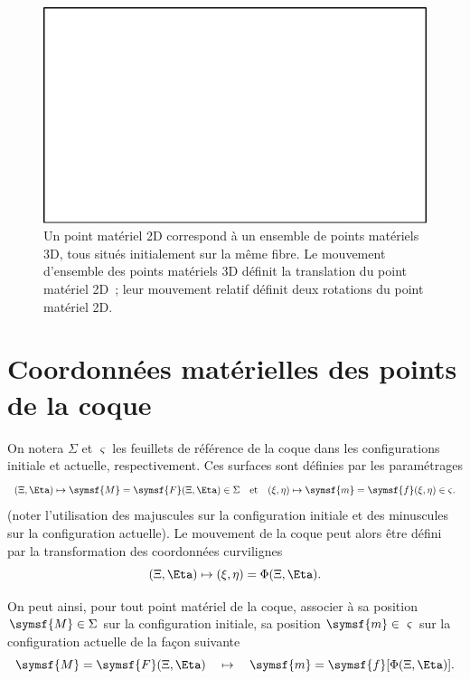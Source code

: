 \documentclass[
  a4paper,
  DIV=11,
  numbers=noendperiod]{scrreprt}
\newcommand{\point}[1]{\symsf{#1}}
\begin{document}
\begin{figure}

{\centering \includegraphics{croquis/blanc.pdf}

}

\caption{\label{fig-20230302052722}Un point matériel 2D correspond à un
ensemble de points matériels 3D, tous situés initialement sur la même
fibre. Le mouvement d'ensemble des points matériels 3D définit la
translation du point matériel 2D~; leur mouvement relatif définit deux
rotations du point matériel 2D.}

\end{figure}

\hypertarget{coordonnuxe9es-matuxe9rielles-des-points-de-la-coque}{%
\section{Coordonnées matérielles des points de la
coque}\label{coordonnuxe9es-matuxe9rielles-des-points-de-la-coque}}

On notera \(\Sigma\) et \(\varsigma\) les feuillets de référence de la
coque dans les configurations initiale et actuelle, respectivement. Ces
surfaces sont définies par les paramétrages \[
(\Xi, \Eta) \mapsto \point{M} = \point{F}(\Xi, \Eta) \in \Sigma
\quad \text{et} \quad
(\xi, \eta) \mapsto \point{m} = \point{f}(\xi, \eta) \in \varsigma.
\] (noter l'utilisation des majuscules sur la configuration initiale et
des minuscules sur la configuration actuelle). Le mouvement de la coque
peut alors être défini par la transformation des coordonnées curvilignes
\[
(\Xi, \Eta) \mapsto (\xi, \eta) = \Phi(\Xi, \Eta).
\]

On peut ainsi, pour tout point matériel de la coque, associer à sa
position \(\point{M} \in \Sigma\) sur la configuration initiale, sa
position \(\point{m} \in \varsigma\) sur la configuration actuelle de la
façon suivante \[
\point{M} = \point{F}(\Xi, \Eta) \quad \mapsto \quad \point{m} = \point{f} [ \Phi(\Xi, \Eta) ].
\]
\end{document}
